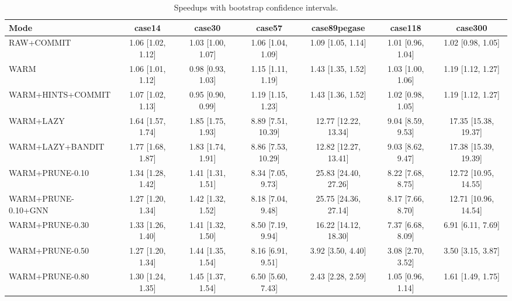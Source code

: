 \begin{table}\centering
\caption{Speedups with bootstrap confidence intervals.}
\label{tab:speedup_ci}
\renewcommand{\arraystretch}{1.2}
\footnotesize
\begin{tabular}{|l||c|c|c|c|c|c|}\hline
\textbf{Mode} & \textbf{case14} & \textbf{case30} & \textbf{case57} & \textbf{case89pegase} & \textbf{case118} & \textbf{case300} \\ \hline \hline
RAW+COMMIT & 1.06 [1.02, 1.12] & 1.03 [1.00, 1.07] & 1.06 [1.04, 1.09] & 1.09 [1.05, 1.14] & 1.01 [0.96, 1.04] & 1.02 [0.98, 1.05] \\ \hline
WARM & 1.06 [1.01, 1.12] & 0.98 [0.93, 1.03] & 1.15 [1.11, 1.19] & 1.43 [1.35, 1.52] & 1.03 [1.00, 1.06] & 1.19 [1.12, 1.27] \\ \hline
WARM+HINTS+COMMIT & 1.07 [1.02, 1.13] & 0.95 [0.90, 0.99] & 1.19 [1.15, 1.23] & 1.43 [1.36, 1.52] & 1.02 [0.98, 1.05] & 1.19 [1.12, 1.27] \\ \hline
WARM+LAZY & 1.64 [1.57, 1.74] & 1.85 [1.75, 1.93] & 8.89 [7.51, 10.39] & 12.77 [12.22, 13.34] & 9.04 [8.59, 9.53] & 17.35 [15.38, 19.37] \\ \hline
WARM+LAZY+BANDIT & 1.77 [1.68, 1.87] & 1.83 [1.74, 1.91] & 8.86 [7.53, 10.29] & 12.82 [12.27, 13.41] & 9.03 [8.62, 9.47] & 17.38 [15.39, 19.39] \\ \hline
WARM+PRUNE-0.10 & 1.34 [1.28, 1.42] & 1.41 [1.31, 1.51] & 8.34 [7.05, 9.73] & 25.83 [24.40, 27.26] & 8.22 [7.68, 8.75] & 12.72 [10.95, 14.55] \\ \hline
WARM+PRUNE-0.10+GNN & 1.27 [1.20, 1.34] & 1.42 [1.32, 1.52] & 8.18 [7.04, 9.48] & 25.75 [24.36, 27.14] & 8.17 [7.66, 8.70] & 12.71 [10.96, 14.54] \\ \hline
WARM+PRUNE-0.30 & 1.33 [1.26, 1.40] & 1.41 [1.32, 1.50] & 8.50 [7.19, 9.94] & 16.22 [14.12, 18.30] & 7.37 [6.68, 8.09] & 6.91 [6.11, 7.69] \\ \hline
WARM+PRUNE-0.50 & 1.27 [1.20, 1.34] & 1.44 [1.35, 1.54] & 8.16 [6.91, 9.51] & 3.92 [3.50, 4.40] & 3.08 [2.70, 3.52] & 3.50 [3.15, 3.87] \\ \hline
WARM+PRUNE-0.80 & 1.30 [1.24, 1.35] & 1.45 [1.37, 1.54] & 6.50 [5.60, 7.43] & 2.43 [2.28, 2.59] & 1.05 [0.96, 1.14] & 1.61 [1.49, 1.75] \\ \hline
\end{tabular}
\end{table}
